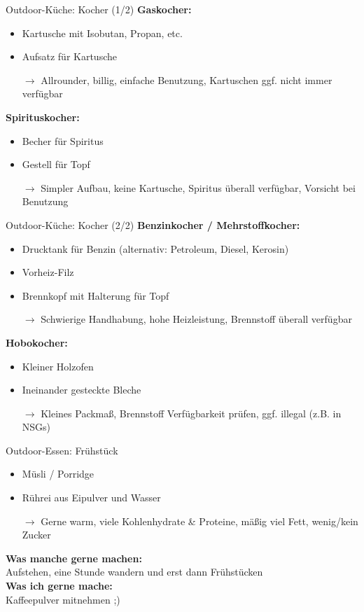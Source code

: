 \documentclass{beamer}
\newcommand{\sarrow}{\small$\rightarrow$}
\newcommand{\tipp}[2][Tipp:]{\vspace{0.2cm}\textbf{#1:}\\#2}
\begin{document}
			\begin{frame}{Outdoor-Küche: Kocher (1/2)}
				\textbf{Gaskocher:}
				\begin{itemize}
					\item Kartusche mit Isobutan, Propan, etc.
					\item Aufsatz für Kartusche
					\item[\sarrow] Allrounder, billig, einfache Benutzung, Kartuschen ggf. nicht immer verfügbar
				\end{itemize}\pause
				\textbf{Spirituskocher:}
				\begin{itemize}
					\item Becher für Spiritus
					\item Gestell für Topf
					\item[\sarrow] Simpler Aufbau, keine Kartusche, Spiritus überall verfügbar, Vorsicht bei Benutzung
				\end{itemize}
			\end{frame}
		
			\begin{frame}{Outdoor-Küche: Kocher (2/2)}
				\textbf{Benzinkocher / Mehrstoffkocher:}
				\begin{itemize}
					\item Drucktank für Benzin (alternativ: Petroleum, Diesel, Kerosin)
					\item Vorheiz-Filz
					\item Brennkopf mit Halterung für Topf
					\item[\sarrow] Schwierige Handhabung, hohe Heizleistung, Brennstoff überall verfügbar
				\end{itemize}\pause
				\textbf{Hobokocher:}
				\begin{itemize}
					\item Kleiner Holzofen
					\item Ineinander gesteckte Bleche
					\item[\sarrow] Kleines Packmaß, Brennstoff Verfügbarkeit prüfen, ggf. illegal (z.B. in NSGs) 
				\end{itemize}
			\end{frame}
			
			\begin{frame}{Outdoor-Essen: Frühstück}
				\begin{itemize}
					\item Müsli / Porridge
					\item Rührei aus Eipulver und Wasser
					\item[\sarrow] Gerne warm, viele Kohlenhydrate \& Proteine, mäßig viel Fett, wenig/kein Zucker
				\end{itemize}\pause
				\tipp[Was manche gerne machen]{Aufstehen, eine Stunde wandern und erst dann Frühstücken}\\\pause
				\tipp[Was ich gerne mache]{Kaffeepulver mitnehmen ;)}
			\end{frame}
			
\end{document}
